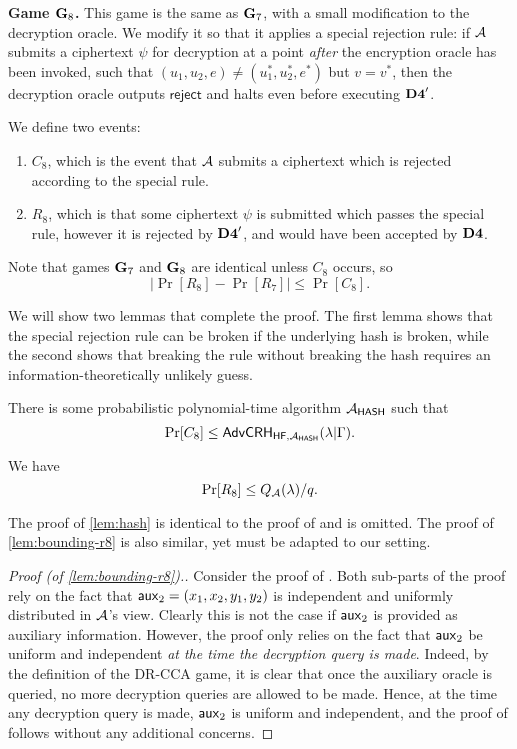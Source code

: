 \textbf{Game $\mathbf{G}_8$.} This game is the same as $\mathbf{G}_7$, with a small modification to the decryption oracle. We modify it so that it applies a special rejection rule: if $\mathcal{A}$ submits a ciphertext $\psi$ for decryption at a point \textit{after} the encryption oracle has been invoked, such that $(u_1, u_2, e)\neq (u_1^{*}, u_2^{*}, e^{*})$ but $v = v^{*}$, then the decryption oracle outputs $\mathsf{reject}$ and halts even before executing $\mathbf{D4}'$.

We define two events:
\begin{enumerate}
	\item $C_8$, which is the event that $\mathcal{A}$ submits a ciphertext which is rejected according to the special rule.
	\item $R_8$, which is that some ciphertext $\psi$ is submitted which passes the special rule, however it is rejected by $\mathbf{D4}'$, and would have been accepted by $\mathbf{D4}$.
\end{enumerate}

Note that games $\mathbf{G}_7$ and $\mathbf{G}_8$ are identical unless $C_8$ occurs, so
$$|\Pr[R_8]-\Pr[R_7]|\leq\Pr[C_8].$$

We will show two lemmas that complete the proof. The first lemma shows that the special rejection rule can be broken if the underlying hash is broken, while the second shows that breaking the rule without breaking the hash requires an information-theoretically unlikely guess.

\begin{lemma}
	\label{lem:hash}
	There is some probabilistic polynomial-time algorithm $\mathcal{A}_\mathsf{HASH}$ such that $$\Pr[C_8]\leq\mathsf{AdvCRH}_{\mathsf{HF},\mathcal{A}_\mathsf{HASH}}(\lambda|\Gamma).$$
\end{lemma}

\begin{lemma}
	\label{lem:bounding-r8}
	We have $$\Pr[R_8]\leq Q_{\mathcal{A}}(\lambda)/q.$$
\end{lemma}
The proof of \cref{lem:hash} is identical to the proof of \cite[Lemma~7]{cs01} and is omitted. The proof of \cref{lem:bounding-r8} is also similar, yet must be adapted to our setting. 

\begin{proof}[Proof (of \cref{lem:bounding-r8}).]
	Consider the proof of \cite[Lemma~8]{cs01}. Both sub-parts of the proof rely on the fact that $\mathsf{aux}_2 = (x_1,x_2,y_1,y_2)$ is independent  and uniformly distributed in $\mathcal{A}$'s view. Clearly this is not the case if $\mathsf{aux}_2$ is provided as auxiliary information. However, the proof only relies on the fact that $\mathsf{aux}_2$ be uniform and independent \textit{at the time the decryption query is made}. Indeed, by the definition of the DR-CCA game, it is clear that once the auxiliary oracle is queried, no more decryption queries are allowed to be made. Hence, at the time any decryption query is made, $\mathsf{aux}_2$ is uniform and independent, and the proof of \cite[Lemma~8]{cs01} follows without any additional concerns.
\end{proof}

